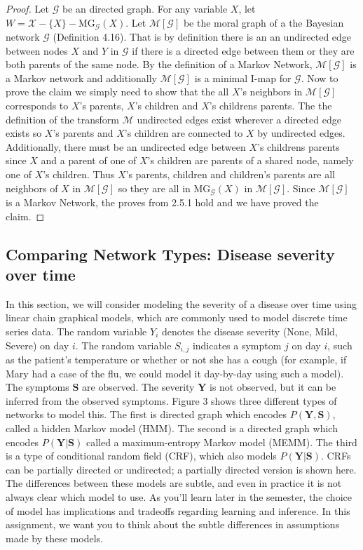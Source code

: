 \documentclass[12pt]{article}
\newcommand{\mg} {
\text{MG}_{\mathcal{G}}
}
\begin{document}
\begin{enumerate}[1.]
\begin{proof}
Let $\mathcal{G}$ be an directed graph. For any variable $X$, let $W = \mathcal{X} - \{ X\} - \mg(X)$. 
Let $\mathcal{M}[\mathcal{G}]$ be the moral graph of a the Bayesian network $\mathcal{G}$ (Definition 4.16). That is by definition there is an an undirected edge between nodes $X$ and $Y$ in $\mathcal{G}$ if there is a directed edge between them or they are both parents of the same node. By the definition of a Markov Network, $\mathcal{M}[{\mathcal{G}}]$ is a Markov network and additionally $\mathcal{M}[\mathcal{G}]$ is a minimal I-map for $\mathcal{G}$. Now to prove the claim we simply need to show that the  all $X$'s neighbors in $\mathcal{M}[\mathcal{G}]$ corresponds to $X$'s parents, $X$'s children and $X$'s childrens parents. The the definition of the transform $\mathcal{M}$ undirected edges exist wherever a directed edge exists so $X$'s parents and $X$'s children are connected to $X$ by undirected edges. Additionally, there must be an undirected edge between $X$'s childrens parents since $X$ and a parent of one of $X$'s children are parents of a shared node, namely one of $X$'s children. Thus $X$'s parents, children and children's parents are all neighbors of $X$ in $\mathcal{M}[\mathcal{G}]$ so they are all in $\mg(X)$ in $\mathcal{M}[\mathcal{G}]$. Since $\mathcal{M}[\mathcal{G}]$ is a Markov Network, the proves from 2.5.1 hold and we have proved the claim.
\end{proof}

\end{enumerate}
\subsection{Comparing Network Types: Disease severity over time}
In this section, we will consider modeling the severity of a disease over time using linear chain graphical models, which are commonly used to model discrete time series data.
The random variable $Y_i$ denotes the disease severity (None, Mild, Severe) on day $i$. The random variable $S_{i,j}$ indicates a symptom $j$ on day $i$, such as the patient’s temperature or whether or not she has a cough (for example, if Mary had a case of the flu, we could model it day-by-day using such a model). The symptoms $\mathbf{S}$ are observed. The severity $\mathbf{Y}$ is not observed, but it can be inferred from the observed symptoms.
Figure 3 shows three different types of networks to model this. The first is directed graph which encodes $P(\mathbf{Y}, \mathbf{S})$, called a hidden Markov model (HMM). The second is a directed graph which encodes $P(\mathbf{Y}|\mathbf{S})$ called a maximum-entropy Markov model (MEMM). The third is a type of conditional random field (CRF), which also models $P(\mathbf{Y}|\mathbf{S})$. CRFs can be partially directed or undirected; a partially directed version is shown here.
The differences between these models are subtle, and even in practice it is not always clear which model to use. As you’ll learn later in the semester, the choice of model has implications and tradeoffs regarding learning and inference. In this assignment, we want you to think about the subtle differences in assumptions made by these models.
\end{document}
